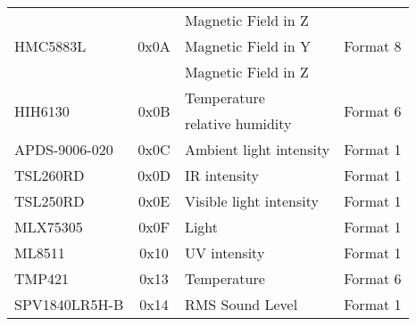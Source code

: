 \begin{center}
\begin{longtable}{|l|c|>{\centering}p{}|c|}
    \rowcolor{black!8} \multicolumn{4}{|c|}{{Lightsense board}} \\ \hline
        \multirow{3}{*}{HMC5883L} & \multirow{3}{*}{0x0A} & Magnetic Field in Z & \multirow{3}{*}{Format 8}\\ \cline{3-3}
        & & Magnetic Field in Y & \\ \cline{3-3}
        & & Magnetic Field in Z & \\ \hline
        \multirow{2}{*}{HIH6130} & \multirow{2}{*}{0x0B} & Temperature & \multirow{2}{*}{Format 6}\\ \cline{3-3}
        & & relative humidity & \\ \hline
        APDS-9006-020 & 0x0C & Ambient light intensity & Format 1\\ \hline
        TSL260RD & 0x0D & IR intensity & Format 1\\ \hline
        TSL250RD & 0x0E & Visible light intensity & Format 1\\ \hline
        MLX75305 & 0x0F & Light & Format 1\\ \hline 
        ML8511 & 0x10 & UV intensity & Format 1\\ \hline
        TMP421 & 0x13 & Temperature & Format 6\\ \hline
        SPV1840LR5H-B & 0x14 & RMS Sound Level & Format 1\\ \hline


\end{longtable}
\end{center}
